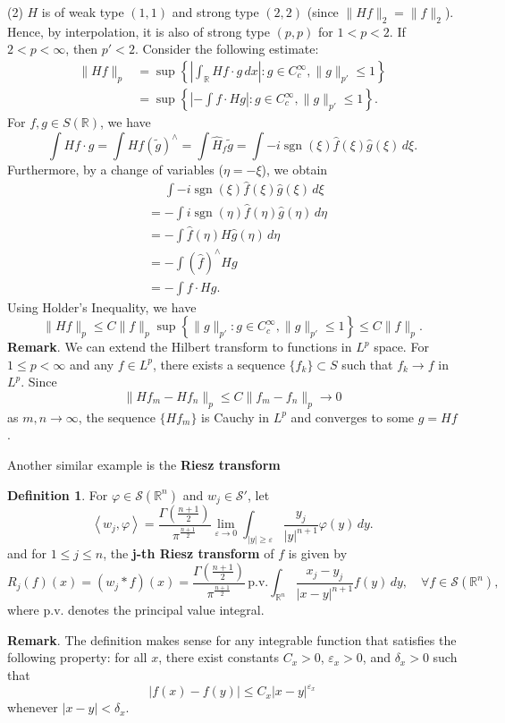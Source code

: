 \documentclass[12pt,openany]{book}
\theoremstyle{definition}
\newtheorem{definition}[theorem]{Definition}
\begin{document}
(2) $H$ is of weak type $(1,1)$ and strong type $(2,2)$ (since $\|Hf\|_2 = \|f\|_2$). Hence, by interpolation, it is also of strong type $(p,p)$ for $1 < p < 2$.  
If $2 < p < \infty$, then $p' < 2$. Consider the following estimate:  
\[  
\begin{aligned}  
\|Hf\|_p &= \sup \left\{ \left| \int_{\mathbb{R}} Hf \cdot g \, dx \right| : g \in C_c^{\infty}, \|g\|_{p'} \leq 1 \right\} \\  
&= \sup \left\{ \left| -\int f \cdot Hg \right| : g \in C_c^{\infty}, \|g\|_{p'} \leq 1 \right\}.  
\end{aligned}  
\]  
For $f , g \in S(\mathbb{R})$, we have  
\[  
\int Hf \cdot g = \int Hf(\tilde{g})^{\wedge} = \int \hat{H}_f \tilde{g} = \int -i \operatorname{sgn}(\xi) \hat{f}(\xi) \hat{g}(\xi) \, d\xi.  
\]  
Furthermore, by a change of variables ($\eta = -\xi$), we obtain  
\[  
\begin{aligned}  
&\phantom{{}={}} \int -i \operatorname{sgn}(\xi) \hat{f}(\xi) \hat{g}(\xi) \, d\xi \\  
&= -\int i \operatorname{sgn}(\eta) \hat{f}(\eta) \hat{g}(\eta) \, d\eta \\  
&= -\int \hat{f}(\eta) H\hat{g}(\eta) \, d\eta \\  
&= -\int (\hat{f})^{\wedge} Hg \\  
&= -\int f \cdot Hg.  
\end{aligned}  
\]  
Using Holder's Inequality, we have  
\[  
\|Hf\|_p \leqslant C\|f\|_p \sup \left\{ \|g\|_{p'} : g \in C_c^{\infty}, \|g\|_{p'} \leq 1 \right\} \leqslant C\|f\|_p.  
\]  
\noindent\textbf{Remark}. We can extend the Hilbert transform to functions in $L^p$ space. For $1 \leq p < \infty$ and any $f \in L^p$, there exists a sequence $\{f_k\} \subset S$ such that $f_k \rightarrow f$ in $L^p$. Since  
\[  
\|Hf_m - Hf_n\|_p \leq C\|f_m - f_n\|_p \rightarrow 0  
\]  
as $m, n \rightarrow \infty$, the sequence $\{Hf_m\}$ is Cauchy in $L^p$ and converges to some $g = Hf$.

Another similar example is the \textbf{Riesz transform}
\begin{definition}
    For $\varphi \in \mathcal{S}(\mathbb{R}^n)$ and $w_j \in \mathcal{S}'$, let
\[
\left\langle w_j, \varphi \right\rangle = \frac{\Gamma\left(\frac{n+1}{2}\right)}{\pi^{\frac{n+1}{2}}} \lim_{\varepsilon \rightarrow 0} \int_{|y| \geqslant \varepsilon} \frac{y_j}{|y|^{n+1}} \varphi(y) \, dy.
\]
and for $1 \leq j \leq n$, the \textbf{j-th Riesz transform} of $f$ is given by
\[
R_j(f)(x) = (w_j * f)(x) = \frac{\Gamma\left(\frac{n+1}{2}\right)}{\pi^{\frac{n+1}{2}}} \, \text{p.v.} \int_{\mathbb{R}^n} \frac{x_j-y_j}{|x-y|^{n+1}} f(y) \, dy, \quad \forall f \in \mathcal{S}(\mathbb{R}^n),
\]
where p.v. denotes the principal value integral.
\end{definition}
\noindent\textbf{Remark}. The definition makes sense for any integrable function that satisfies the following property: for all $x$, there exist constants $C_x > 0$, $\varepsilon_x > 0$, and $\delta_x > 0$ such that
\[
|f(x) - f(y)| \leqslant C_x |x-y|^{\varepsilon_x}
\]
whenever $|x-y| < \delta_x$.
\end{document}
